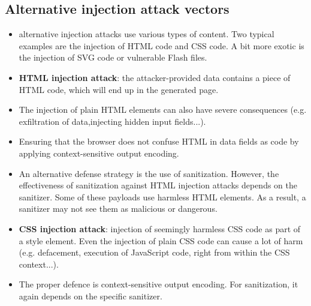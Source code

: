 \documentclass[../main.tex]{subfiles}
\begin{document}
\subsection{Alternative injection attack vectors}
\begin{itemize}
\item alternative injection attacks use various types of content. Two typical examples are the injection of HTML code and CSS code. A bit more exotic is the injection of SVG code or vulnerable Flash files.
\item \textbf{HTML injection attack}: the attacker-provided data contains a piece of HTML code, which will end up in the generated page.
\item The injection of plain HTML elements can also have severe consequences (e.g. exfiltration of data,injecting hidden input fields...).
\item Ensuring that the browser does not confuse HTML in data fields as code by applying context-sensitive output encoding.
\item An alternative defense strategy is the use of sanitization. However, the effectiveness of sanitization against HTML injection attacks depends on the sanitizer. Some of these payloads use harmless HTML elements. As a result, a sanitizer may not see them as malicious or dangerous.
\item \textbf{CSS injection attack}: injection of seemingly harmless CSS code as part of a style element. Even the injection of plain CSS code can cause a lot of harm (e.g. defacement, execution of JavaScript code, right from within the CSS context...).
\item The proper defence is context-sensitive output encoding. For sanitization, it again depends on the specific sanitizer.
\end{itemize}
\end{document}
